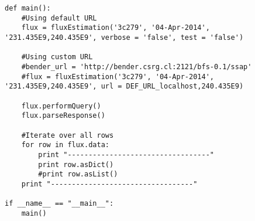 \documentclass[10pt]{article}
\begin{document}
\begingroup
\fontsize{8pt}{10pt}\selectfont
\lstset{language=Python}
\begin{lstlisting}
def main():
    #Using default URL
    flux = fluxEstimation('3c279', '04-Apr-2014', '231.435E9,240.435E9', verbose = 'false', test = 'false')

    #Using custom URL
    #bender_url = 'http://bender.csrg.cl:2121/bfs-0.1/ssap'
    #flux = fluxEstimation('3c279', '04-Apr-2014', '231.435E9,240.435E9', url = DEF_URL_localhost,240.435E9)

    flux.performQuery()
    flux.parseResponse()

    #Iterate over all rows
    for row in flux.data:
        print "----------------------------------"
        print row.asDict()
        #print row.asList()
    print "----------------------------------"

if __name__ == "__main__":
    main()
\end{lstlisting}
\endgroup
\end{document}
